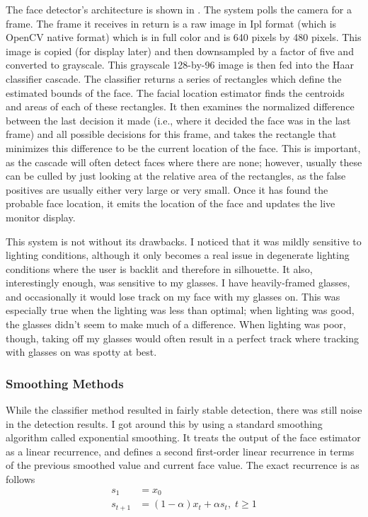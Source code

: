 The face detector's architecture is shown in . The
system polls the camera for a frame. The frame it receives in return
is a raw image in Ipl format (which is OpenCV native format) which is
in full color and is 640 pixels by 480 pixels. This image is copied
(for display later) and then downsampled by a factor of five and
converted to grayscale. This grayscale 128-by-96 image is then fed
into the Haar classifier cascade. The classifier returns a series of
rectangles which define the estimated bounds of the face. The facial
location estimator finds the centroids and areas of each of these
rectangles. It then examines the normalized difference between the
last decision it made (i.e., where it decided the face was in the last
frame) and all possible decisions for this frame, and takes the
rectangle that minimizes this difference to be the current location of
the face. This is important, as the cascade will often detect faces
where there are none; however, usually these can be culled by just
looking at the relative area of the rectangles, as the false positives
are usually either very large or very small. Once it has found the
probable face location, it emits the location of the face and updates
the live monitor display.

This system is not without its drawbacks. I noticed that it was mildly
sensitive to lighting conditions, although it only becomes a real
issue in degenerate lighting conditions where the user is backlit and
therefore in silhouette. It also, interestingly enough, was sensitive
to my glasses. I have heavily-framed glasses, and occasionally it
would lose track on my face with my glasses on. This was especially
true when the lighting was less than optimal; when lighting was good,
the glasses didn't seem to make much of a difference. When lighting
was poor, though, taking off my glasses would often result in a
perfect track where tracking with glasses on was spotty at best.

\subsubsection{Smoothing Methods}
While the classifier method resulted in fairly stable detection, there
was still noise in the detection results. I got around this by using a
standard smoothing algorithm called exponential smoothing. It treats
the output of the face estimator as a linear recurrence, and defines a
second first-order linear recurrence in terms of the previous smoothed
value and current face value. The exact recurrence is as follows
\begin{align*}
  s_1 &= x_0 \\
  s_{t+1} &= (1 - \alpha) x_t + \alpha s_t, \; t \ge 1
\end{align*}

